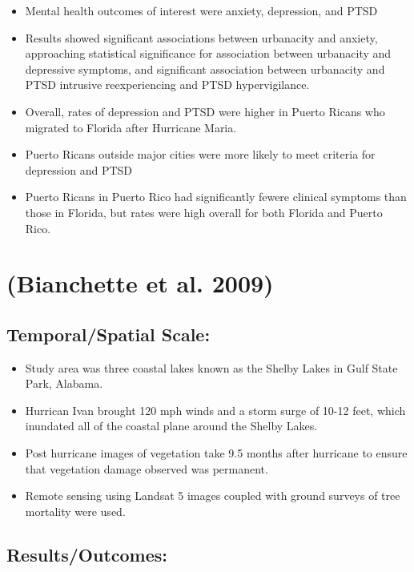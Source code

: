 \documentclass[
]{article}
\providecommand{\tightlist}{%
  \setlength{\itemsep}{0pt}\setlength{\parskip}{0pt}}
\begin{document}
\begin{itemize}
\tightlist
\item
  Mental health outcomes of interest were anxiety, depression, and PTSD
\item
  Results showed significant associations between urbanacity and
  anxiety, approaching statistical significance for association between
  urbanacity and depressive symptoms, and significant association
  between urbanacity and PTSD intrusive reexperiencing and PTSD
  hypervigilance.
\item
  Overall, rates of depression and PTSD were higher in Puerto Ricans who
  migrated to Florida after Hurricane Maria.
\item
  Puerto Ricans outside major cities were more likely to meet criteria
  for depression and PTSD
\item
  Puerto Ricans in Puerto Rico had significantly fewere clinical
  symptoms than those in Florida, but rates were high overall for both
  Florida and Puerto Rico.
\end{itemize}

\hypertarget{bianchette2009ecological}{%
\section{(Bianchette et al. 2009)}\label{bianchette2009ecological}}

\hypertarget{temporalspatial-scale-1}{%
\subsection{Temporal/Spatial Scale:}\label{temporalspatial-scale-1}}

\begin{itemize}
\tightlist
\item
  Study area was three coastal lakes known as the Shelby Lakes in Gulf
  State Park, Alabama.
\item
  Hurrican Ivan brought 120 mph winds and a storm surge of 10-12 feet,
  which inundated all of the coastal plane around the Shelby Lakes.
\item
  Post hurricane images of vegetation take 9.5 months after hurricane to
  ensure that vegetation damage observed was permanent.
\item
  Remote sensing using Landsat 5 images coupled with ground surveys of
  tree mortality were used.
\end{itemize}

\hypertarget{resultsoutcomes-5}{%
\subsection{Results/Outcomes:}\label{resultsoutcomes-5}}
\end{document}
